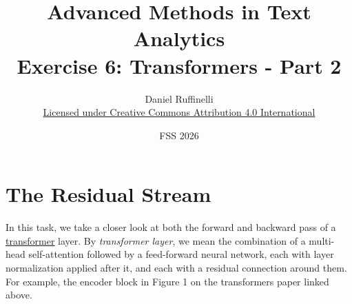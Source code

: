 \documentclass[11pt,a4paper]{article}
\title{Advanced Methods in Text Analytics \\ 
Exercise 6: Transformers - Part 2}
\author{Daniel Ruffinelli \\ \href{https://creativecommons.org/licenses/by/4.0/}{Licensed under Creative Commons Attribution 4.0 International}}
\date{FSS 2026}
\begin{document}
\maketitle

\section{The Residual Stream}

In this task, we take a closer look at both the forward and backward pass of a
\href{https://arxiv.org/pdf/1706.03762}{\underline{transformer}} layer.
By \emph{transformer layer}, we mean the combination of a multi-head
self-attention followed by a feed-forward neural network, each with layer
normalization applied after it, and each with a residual connection around them.
For example, the encoder block in Figure 1 on the transformers paper linked
above.
\end{document}
